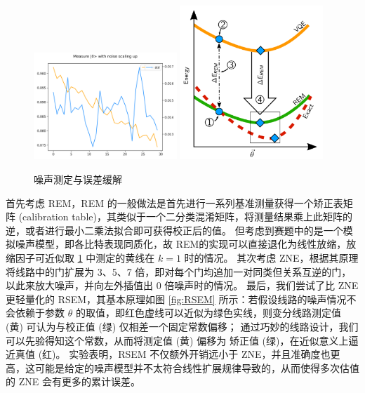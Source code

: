 \documentclass[withoutpreface,bwprint]{cumcmthesis}
\begin{document}
\begin{figure}
	\centering
	{\includegraphics[width=0.48\textwidth]{figures/vis_noise_scale.png}}
	{\includegraphics[width=0.48\textwidth]{figures/RSEM.png}}
	\caption{噪声测定与误差缓解}
	\label{fig:noise}
\end{figure}

首先考虑 REM，REM 的一般做法是首先进行一系列基准测量获得一个矫正表矩阵 (calibration table)，其类似于一个二分类混淆矩阵，将测量结果乘上此矩阵的逆，或者进行最小二乘法拟合即可获得校正后的值。
但考虑到赛题中的是一个模拟噪声模型，即各比特表现同质化，故 REM的实现可以直接退化为线性放缩，放缩因子可近似取 \ref{fig:noise} 中测定的黄线在 $ k = 1 $ 时的情况。
其次考虑 ZNE，根据其原理将线路中的门扩展为 3、5、7 倍，即对每个门均追加一对同类但关系互逆的门，以此来放大噪声，并向左外插值出 0 倍噪声时的情况。
最后，我们尝试了比 ZNE 更轻量化的 RSEM，其基本原理如图 \ref{fig:RSEM} 所示：若假设线路的噪声情况不会依赖于参数 $ \theta $ 的取值，即红色虚线可以近似为绿色实线，则变分线路测定值 (黄) 可认为与校正值 (绿) 仅相差一个固定常数偏移；
通过巧妙的线路设计，我们可以先验得知这个常数，从而将测定值 (黄) 偏移为 矫正值 (绿)，在近似意义上逼近真值 (红)。
实验表明，RSEM 不仅额外开销远小于 ZNE，并且准确度也更高，这可能是给定的噪声模型并不太符合线性扩展规律导致的，从而使得多次估值的 ZNE 会有更多的累计误差。


\end{document}
